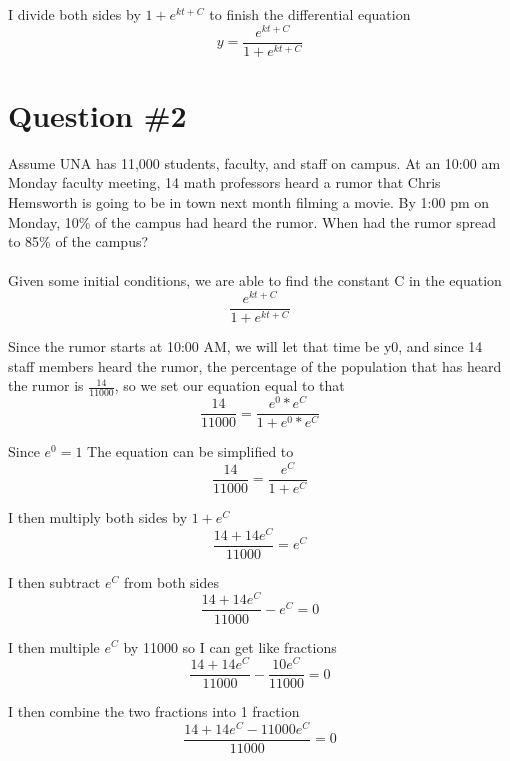 \documentclass[12pt]{article}
\begin{document}
I divide both sides by $1 + e^{kt + C}$ to finish the differential equation
\begin{equation*}
y = \frac{e^{kt + C}}{1 + e^{kt + C}} 
\end{equation*}

\section{Question \#2}
Assume UNA has 11,000 students, faculty, and staff on campus. At an 10:00 am Monday faculty meeting, 14 math professors heard a rumor that Chris Hemsworth is going to be in town next month filming a movie. By 1:00 pm on Monday, 10\% of the campus had heard the rumor. When had the rumor spread to 85\% of the campus?
\\ \\
Given some initial conditions, we are able to find the constant C in the equation
\begin{equation*}
\frac{e^{kt + C}}{1 + e^{kt + C}} 
\end{equation*}

Since the rumor starts at 10:00 AM, we will let that time be y0, and since 14 staff members heard the rumor, the percentage of the population that has heard the rumor is $\frac{14}{11000}$, so we set our equation equal to that
\begin{equation*}
\frac{14}{11000} = \frac{e^0 * e^C}{1 + e^0 * e^C}
\end{equation*}

Since $e^0 = 1$ The equation can be simplified to 
\begin{equation*}
\frac{14}{11000} = \frac{e^C}{1 + e^C}
\end{equation*}

I then multiply both sides by $1 + e^C$
\begin{equation*}
\frac{14+14e^C}{11000} = e^C
\end{equation*}

I then subtract $e^C$ from both sides
\begin{equation*}
\frac{14+14e^C}{11000} - e^C = 0
\end{equation*}

I then multiple $e^C$ by 11000 so I can get like fractions
\begin{equation*}
\frac{14+14e^C}{11000} - \frac{10e^C}{11000} = 0
\end{equation*}

I then combine the two fractions into 1 fraction
\begin{equation*}
\frac{14+14e^C-11000e^C}{11000} = 0
\end{equation*}
\end{document}
